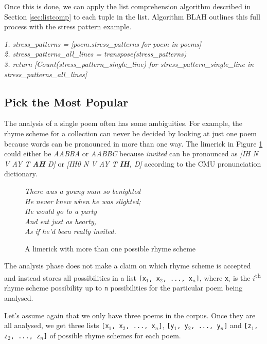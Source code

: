 Once this is done, we can apply the list comprehension algorithm described in Section \ref{sec:listcomp} to each tuple in the list. Algorithm BLAH outlines this full process with the stress pattern example.

\textit{
1. stress\_patterns = [poem.stress\_patterns for poem in poems]\\
2. stress\_patterns\_all\_lines = transpose(stress\_patterns)\\
3. return [Count(stress\_pattern\_single\_line) for stress\_pattern\_single\_line in stress\_patterns\_all\_lines]\\
}
\subsection{Pick the Most Popular}

The analysis of a single poem often has some ambiguities. For example, the rhyme scheme for a collection can never be decided by looking at just one poem because words can be pronounced in more than one way. The limerick in Figure \ref{fig:ambiguous-rhyme} could either be \textit{AABBA} or \textit{AABBC} because \textit{invited} can be pronounced as \textit{[IH N V AY T \textbf{AH} D]} or \textit{[IH0 N V AY T \textbf{IH}, D]} according to the CMU pronunciation dictionary.

\begin{figure}[h!]
\centering
\textit{
There was a young man so benighted\\
He never knew when he was slighted;\\
He would go to a party\\
And eat just as hearty,\\
As if he'd been really invited.\\
}
\caption{A limerick with more than one possible rhyme scheme}
\label{fig:ambiguous-rhyme}
\end{figure}

The analysis phase does not make a claim on which rhyme scheme is accepted and instead stores all possibilities in a list \texttt{[x$_1$, x$_2$, ..., x$_n$]}, where \texttt{x$_i$} is the $i$\textsuperscript{th} rhyme scheme possibility up to \texttt{n} possibilities for the particular poem being analysed.

Let's assume again that we only have three poems in the corpus. Once they are all analysed, we get three lists \texttt{[x$_1$, x$_2$, ..., x$_n$]}, \texttt{[y$_1$, y$_2$, ..., y$_n$]} and \texttt{[z$_1$, z$_2$, ..., z$_n$]} of possible rhyme schemes for each poem.

